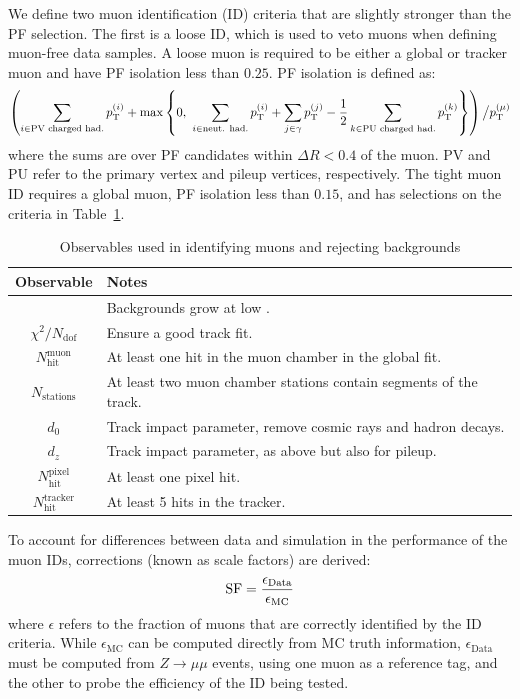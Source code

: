 We define two muon identification (ID) criteria that are slightly stronger than the PF selection. 
The first is a loose ID, which is used to veto muons when defining muon-free data samples.
A loose muon is required to be either a global or tracker muon and have PF isolation less than $0.25$.
PF isolation is defined as:
\begin{equation}
	\left(\sum_{i \in \text{PV charged had.}} p_\mathrm{T}^{(i)} +
	\max\left\{0,~\sum_{i\in\text{neut. had.}} p_\mathrm{T}^{(i)} + \sum_{j\in\gamma} p_\mathrm{T}^{(j)} - 
			\frac{1}{2} \sum_{k\in\text{PU charged had.}}p_\mathrm{T}^{(k)}\right\} \right)
	\big/ p_\mathrm{T}^{(\mu)}
\end{equation}
where the sums are over PF candidates within $\Delta R < 0.4$ of the muon.
PV and PU refer to the primary vertex and pileup vertices, respectively.
The tight muon ID requires a global muon, PF isolation less than $0.15$, and has selections on the criteria in Table~\ref{tab:cms:muon}.

\begin{table}
	\begin{center}
		\caption{Observables used in identifying muons and rejecting backgrounds}
		\label{tab:cms:muon}
		\begin{tabular}{c|p{}}
			Observable & Notes \\ 
			\hline
			\hline
			\pt & Backgrounds grow at low \pt. \\ \hline
			$\chi^2/N_\mathrm{dof}$ & Ensure a good track fit. \\ \hline
			$N_\mathrm{hit}^\mathrm{muon}$ & At least one hit in the muon chamber in the global fit. \\ \hline
			$N_\mathrm{stations}$ & At least two muon chamber stations contain segments of the track. \\ \hline
			$d_0$ & Track impact parameter, remove cosmic rays and hadron decays. \\ \hline
			$d_z$ & Track impact parameter, as above but also for pileup. \\ \hline
			$N_\mathrm{hit}^\mathrm{pixel}$ & At least one pixel hit. \\ \hline
			$N_\mathrm{hit}^\mathrm{tracker}$ & At least 5 hits in the tracker. \\ 
		\end{tabular}
	\end{center}
\end{table}

To account for differences between data and simulation in the performance of the muon IDs, corrections (known as scale factors) are derived:
\begin{equation}
	\mathrm{SF} = \frac{\epsilon_\mathrm{Data}}{\epsilon_\mathrm{MC}}
\end{equation}
where $\epsilon$ refers to the fraction of muons that are correctly identified by the ID criteria.
While $\epsilon_\mathrm{MC}$ can be computed directly from MC truth information, $\epsilon_\mathrm{Data}$ must be computed from $Z\rightarrow \mu\mu$ events, using one muon as a reference tag, and the other to probe the efficiency of the ID being tested.

